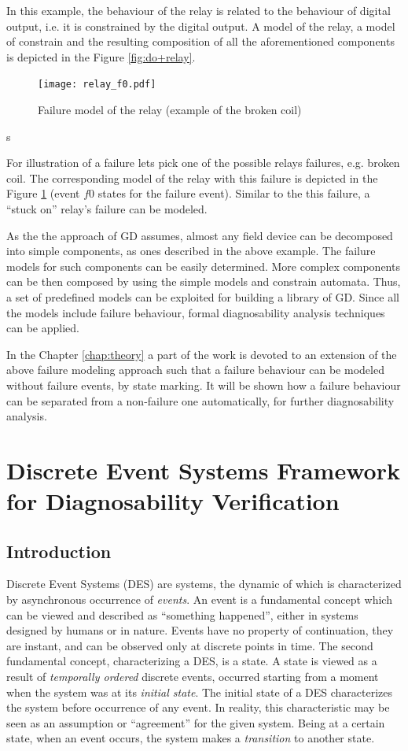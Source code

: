 In this example, the behaviour of the relay is related to the behaviour of
digital output, i.e. it is constrained by the digital output. A model of the
relay, a model of constrain and the resulting composition of all the
aforementioned components is depicted in the Figure \ref{fig:do+relay}.

\begin{figure}[t]
	\centering
	\texttt{[image: relay\_f0.pdf]}
	\caption{Failure model of the relay (example of the broken coil) }
	\label{fig:relay_f0}
\end{figure}s

For illustration of a failure lets pick one of the possible relays failures,
e.g. broken coil. The corresponding model of the relay with this failure is
depicted in the Figure \ref{fig:relay_f0} (event $f0$ states for the failure
event). Similar to the this failure, a ``stuck on'' relay's failure can be
modeled.

As the the approach of GD assumes, almost any field device can be decomposed
into simple components, as ones described in the above example. The failure
models for such components can be easily determined. More complex components can
be then composed by using the simple models and constrain automata. Thus, a
set of predefined models can be exploited for building a library of GD. Since
all the models include failure behaviour, formal diagnosability analysis
techniques can be applied.

In the Chapter \ref{chap:theory} a part of the work is devoted to an extension
of the above failure modeling approach such that a failure behaviour can be
modeled without failure events, by state marking. It will be shown how a failure
behaviour can be separated from a non-failure one automatically, for further
diagnosability analysis.
 

\section{Discrete Event Systems Framework for Diagnosability Verification}

\subsection{Introduction}

Discrete Event Systems (DES) are systems, the dynamic of which is characterized
by asynchronous occurrence of \emph{events}. An event is a fundamental concept
which can be viewed and described as ``something happened'', either in systems
designed by humans or in nature. Events have no property of continuation, they
are instant, and can be observed only at discrete points in time. The second
fundamental concept, characterizing a DES, is a state. A state is viewed as a
result of \emph{temporally ordered} discrete events, occurred starting from a
moment when the system was at its \emph{initial state}. The initial state of a
DES characterizes the system before occurrence of any event. In reality, this
characteristic may be seen as an assumption or ``agreement'' for the given
system. Being at a certain state, when an event occurs, the system makes a
\emph{transition} to another state.


